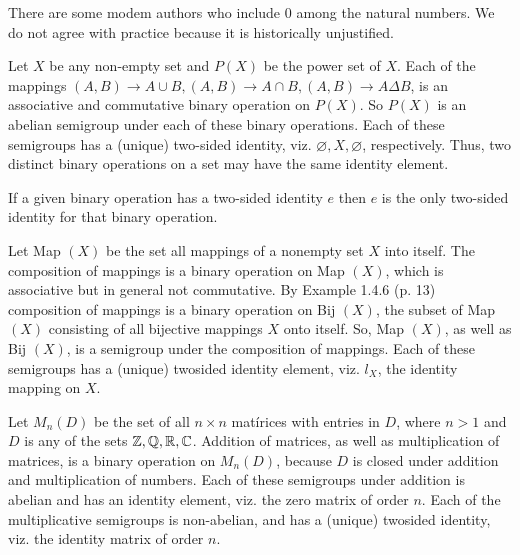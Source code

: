 \documentclass[12pt,class=book,crop=false]{standalone}
\begin{document}
\begin{rem}
    There are some modem authors who include $ 0 $ among the natural numbers. We do not agree with practice because it is historically unjustified.
\end{rem}
\begin{ex} 
    Let $ X $ be any non-empty set and $ P(X) $ be the power set of $ X $.
    Each of the mappings $ (A, B) \to  A \cup B, (A, B) \to A \cap B, (A, B) \to A\Delta B$, is an associative and commutative binary operation on $ P(X) $. So $ P(X) $ is an abelian semigroup under each of these binary operations. Each of these semigroups has a (unique) two-sided identity, viz. $ \varnothing , X, \varnothing $, respectively. Thus, two distinct binary operations on a set may have the same identity element.
\end{ex}
\begin{rem}
    If a given binary operation has a two-sided identity $ e $ then $ e $ is the only two-sided identity for that binary operation.
\end{rem}
\begin{ex}
    Let Map $ (X) $ be the set all mappings of a nonempty set $ X $ into itself. The composition of mappings is a binary operation on Map $ (X) $, which is associative but in general not commutative. By Example 1.4.6 (p. 13) composition of mappings is a binary operation on Bij $ (X) $, the subset of Map $ (X) $ consisting of all bijective mappings $ X $ onto itself. So, Map $ (X) $, as well as Bij $ (X) $, is a semigroup under the composition of mappings. Each of these semigroups has a (unique) twosided identity element, viz. $ l_X $, the identity mapping on $ X $.
\end{ex}
\begin{ex}
    Let $ M_n (D) $ be the set of all $ n \times n $ matírices with entries in $ D $, where $ n > 1 $ and $ D $ is any of the sets $ \mathbb{Z}, \mathbb{Q}, \mathbb{R}, \mathbb{C} $. Addition of matrices, as well as multiplication of matrices, is a binary operation on $ M_n (D) $, because $ D $ is closed under addition and multiplication of numbers. Each of these semigroups under addition is abelian and has an identity element, viz. the zero matrix of order $ n $. Each of the multiplicative semigroups is non-abelian, and has a (unique) twosided identity, viz. the identity matrix of order $ n $.
\end{ex}
\end{document}
